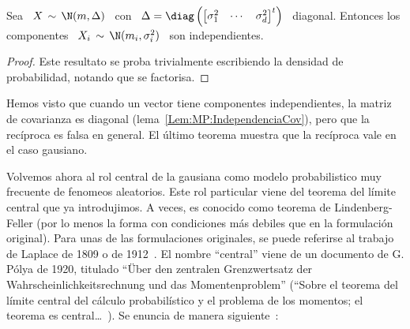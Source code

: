 %
\begin{teorema}[Independencia]
\label{Teo:MP:IndependenciaGaussiana}
%
  Sea   \   $X  \,   \sim   \,   \N(m,\Delta)$  \   con   \   $\Delta  =   \diag
  \left(  \begin{bmatrix}  \sigma_1^2  &  \cdots  &  \sigma_d^2  \end{bmatrix}^t
  \right)$   \  diagonal.   Entonces  los   componentes  \   $X_i  \,   \sim  \,
  \N(m_i,\sigma_i^2)$ \ son independientes.
\end{teorema}
%
\begin{proof}
  Este resultato se proba  trivialmente escribiendo la densidad de probabilidad,
  notando que se factorisa.
\end{proof}
%
Hemos visto que cuando un  vector tiene componentes independientes, la matriz de
covarianza  es   diagonal  (lema~\ref{Lem:MP:IndependenciaCov}),  pero   que  la
rec\'iproca es falsa en general.  El \'ultimo teorema muestra que la rec\'iproca
vale en el caso gausiano.

Volvemos  ahora al rol  central de  la gausiana  como modelo  probabilistico muy
frecuente  de fenomeos  aleatorios. Este  rol particular  viene del  teorema del
l\'imite  central que  ya introdujimos.  A veces,  es conocido  como  teorema de
Lindenberg-Feller (por lo menos la forma con condiciones m\'as debiles que en la
formulaci\'on original).   Para unas de  las formulaciones originales,  se puede
referirse  al trabajo  de Laplace  de  1809 o  de 1912~\cite{Lap09,  Lap09:Supp,
  Lap12,  Lap14, Lap20}.   El nombre  ``central'' viene  de un  documento  de G.
P\'olya   de   1920,  titulado   ``\"Uber   den   zentralen  Grenzwertsatz   der
Wahrscheinlichkeitsrechnung  und das Momentenproblem''  (``Sobre el  teorema del
l\'imite central del  c\'alculo probabil\'istico y el problema  de los momentos;
el  teorema  es  central\ldots~\cite{Pol20,   Cam86}).   Se  enuncia  de  manera
siguiente~\cite{Spi76, BroDav87, LehCas98, AshDol99, JacPro03, AthLah06, Bil12}:


